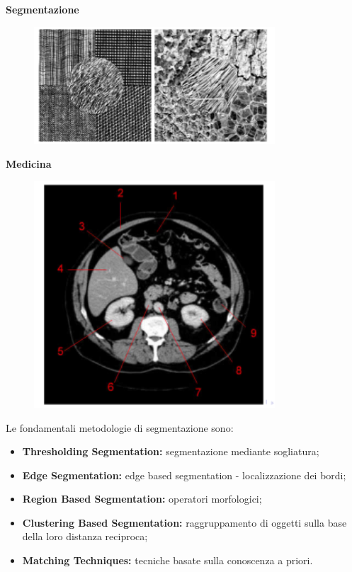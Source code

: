 \textbf{Segmentazione}

\begin{figure}[H]
    \centering
    \includegraphics[width=9cm, keepaspectratio]{capitoli/immagini/imgs/texture.png}
\end{figure}

\newpage
\textbf{Medicina}

\begin{figure}[H]
    \centering
    \includegraphics[width=9cm, keepaspectratio]{capitoli/immagini/imgs/medicina.png}
\end{figure}

Le fondamentali metodologie di segmentazione sono:
\begin{itemize}
    \item \textbf{Thresholding Segmentation:} segmentazione mediante
          sogliatura;
    \item \textbf{Edge Segmentation:} edge based segmentation - localizzazione
          dei bordi;
    \item \textbf{Region Based Segmentation:} operatori morfologici;
    \item \textbf{Clustering Based Segmentation:} raggruppamento di oggetti
          sulla base della loro distanza reciproca;
    \item \textbf{Matching Techniques:} tecniche basate sulla conoscenza a
          priori.
\end{itemize}

